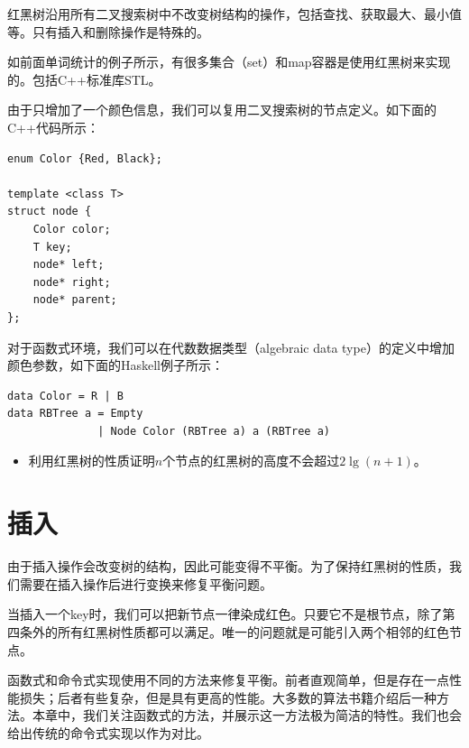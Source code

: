 \documentclass{ctexart}
\begin{document}
红黑树沿用所有二叉搜索树中不改变树结构的操作，包括查找、获取最大、最小值等。只有插入和删除操作是特殊的。

如前面单词统计的例子所示，有很多集合（set）和map容器是使用红黑树来实现的。包括C++标准库STL\cite{sgi-stl}。

由于只增加了一个颜色信息，我们可以复用二叉搜索树的节点定义。如下面的C++代码所示：

\lstset{language=C++}
\begin{lstlisting}
enum Color {Red, Black};

template <class T>
struct node {
    Color color;
    T key;
    node* left;
    node* right;
    node* parent;
};
\end{lstlisting}

对于函数式环境，我们可以在代数数据类型（algebraic data type）的定义中增加颜色参数，如下面的Haskell例子所示：

\lstset{language=Haskell}
\begin{lstlisting}[style=Haskell]
data Color = R | B
data RBTree a = Empty
              | Node Color (RBTree a) a (RBTree a)
\end{lstlisting}

\begin{Exercise}

\begin{itemize}
\item 利用红黑树的性质证明$n$个节点的红黑树的高度不会超过$2 \lg (n+1)$。
\end{itemize}

\end{Exercise}

\section{插入}

由于插入操作会改变树的结构，因此可能变得不平衡。为了保持红黑树的性质，我们需要在插入操作后进行变换来修复平衡问题。

当插入一个key时，我们可以把新节点一律染成红色。只要它不是根节点，除了第四条外的所有红黑树性质都可以满足。唯一的问题就是可能引入两个相邻的红色节点。

函数式和命令式实现使用不同的方法来修复平衡。前者直观简单，但是存在一点性能损失；后者有些复杂，但是具有更高的性能。大多数的算法书籍介绍后一种方法。本章中，我们关注函数式的方法，并展示这一方法极为简洁的特性。我们也会给出传统的命令式实现以作为对比。
\end{document}
